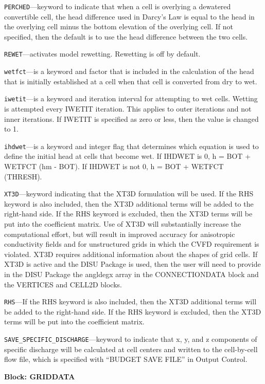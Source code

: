 \begin{description}
\item \texttt{PERCHED}---keyword to indicate that when a cell is overlying a dewatered convertible cell, the head difference used in Darcy's Law is equal to the head in the overlying cell minus the bottom elevation of the overlying cell.  If not specified, then the default is to use the head difference between the two cells.

\item \texttt{REWET}---activates model rewetting.  Rewetting is off by default.

\item \texttt{wetfct}---is a keyword and factor that is included in the calculation of the head that is initially established at a cell when that cell is converted from dry to wet.

\item \texttt{iwetit}---is a keyword and iteration interval for attempting to wet cells. Wetting is attempted every IWETIT iteration. This applies to outer iterations and not inner iterations. If IWETIT is specified as zero or less, then the value is changed to 1.

\item \texttt{ihdwet}---is a keyword and integer flag that determines which equation is used to define the initial head at cells that become wet.  If IHDWET is 0, h = BOT + WETFCT (hm - BOT). If IHDWET is not 0, h = BOT + WETFCT (THRESH).

\item \texttt{XT3D}---keyword indicating that the XT3D formulation will be used.  If the RHS keyword is also included, then the XT3D additional terms will be added to the right-hand side.  If the RHS keyword is excluded, then the XT3D terms will be put into the coefficient matrix.  Use of XT3D will substantially increase the computational effort, but will result in improved accuracy for anisotropic conductivity fields and for unstructured grids in which the CVFD requirement is violated.  XT3D requires additional information about the shapes of grid cells.  If XT3D is active and the DISU Package is used, then the user will need to provide in the DISU Package the angldegx array in the CONNECTIONDATA block and the VERTICES and CELL2D blocks.

\item \texttt{RHS}---If the RHS keyword is also included, then the XT3D additional terms will be added to the right-hand side.  If the RHS keyword is excluded, then the XT3D terms will be put into the coefficient matrix.

\item \texttt{SAVE\_SPECIFIC\_DISCHARGE}---keyword to indicate that x, y, and z components of specific discharge will be calculated at cell centers and written to the cell-by-cell flow file, which is specified with ``BUDGET SAVE FILE'' in Output Control.

\end{description}
\item \textbf{Block: GRIDDATA}

